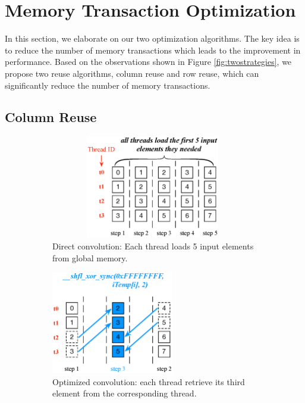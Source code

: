 \section{Memory Transaction Optimization}
\label{sec:strategies} In this section, we elaborate on our two optimization algorithms. The key idea is to reduce the  number of memory
transactions which leads to the improvement in performance. Based on the observations shown in Figure \ref{fig:twostrategies}, we propose
two reuse algorithms, column reuse and row reuse, which can significantly reduce the number of memory transactions.


\subsection{Column Reuse}
\begin{figure}
	\begin{subfigure}{0.33\textwidth}
		\centering
		\captionsetup{width=0.9\textwidth}
		 \includegraphics[width=0.98\textwidth,height=4.5cm]{./figure/directconv.eps}
		 \caption{Direct convolution: Each thread loads 5 input elements from global memory.}
		 \label{fig:directalgo}
	\end{subfigure}
	\begin{subfigure}{0.3\textwidth}
		\centering
		\captionsetup{width=0.9\textwidth}
		 \includegraphics[width=\textwidth,height=4.5cm]{./figure/optalgo1.eps}
		 \caption{Optimized convolution: each thread retrieve its third element from the corresponding thread.}
		 \label{fig:optalgo1}
	\end{subfigure}
	\begin{subfigure}{0.3\textwidth}
		\centering
		\captionsetup{width=0.9\textwidth}


\end{subfigure}
\end{figure}
